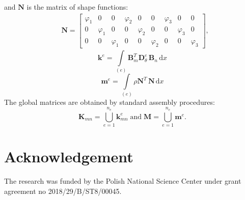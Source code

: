 \documentclass[preprint,12pt]{elsarticle}
\newcommand{\matr}[1]{\mathbf{#1}} %
\newcommand{\ud}{\mathrm{d}}
\begin{document}
	 and $\matr{N}$ is the matrix of shape functions:
	  \begin{equation}
	 \begin{split}
	 & \matr{N} = \left[\begin{array}{ccccccccc} 
	 \varphi_1 & 0 & 0  & \varphi_2 & 0 & 0 & \varphi_3 & 0 & 0\\[4pt]
	 0&\varphi_1&0 &  0&\varphi_2&0 &  0&\varphi_3&0\\[4pt]
	 0 &0&\varphi_1 & 0 &0&\varphi_2 & 0 &0&\varphi_3 
	 \end{array} \right], 
	 \end{split}
	 \end{equation}
	 \begin{equation}
	 \matr{k}^e= \int \limits_{(e)} \matr{B}_m^{T} \matr{D}_{\theta}^e \, \matr{B}_n\, \ud x 
	 \end{equation}
	 \begin{equation}
	 \matr{m}^e= \int \limits_{(e)}\rho \matr{N}^{T} \, \matr{N}\, \ud x 
 	\end{equation}
 	The global matrices are obtained by standard assembly procedures:
 	\begin{equation}
 	\matr{K}_{mn}= \bigcup_{e=1}^{n_e} \matr{k}_{mn}^{e} \; \textrm{and} \; \matr{M}= \bigcup_{e=1}^{n_e} \matr{m}^{e}. 
 	\end{equation}
	\section*{Acknowledgement}
   The research was funded by the Polish National Science Center under grant agreement no 2018/29/B/ST8/00045. 

	
	

    
	{}
\end{document}
